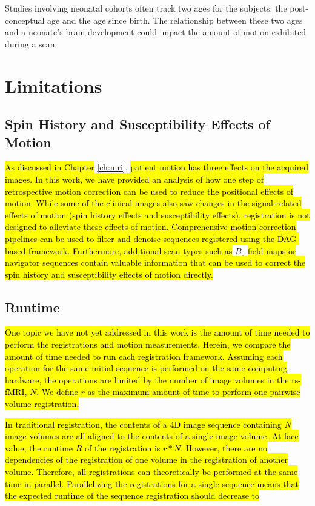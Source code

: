 Studies involving neonatal cohorts often track two ages for the subjects: the post-conceptual age and the age since birth. The relationship between these two ages and a neonate's brain development could impact the amount of motion exhibited during a scan.


\section{Limitations}

\subsection{Spin History and Susceptibility Effects of Motion}

\hl{As discussed in Chapter} \ref{ch:mri}, \hl{patient motion has three effects on the acquired images. In this work, we have provided an analysis of how one step of retrospective motion correction can be used to reduce the positional effects of motion. While some of the clinical images also saw changes in the signal-related effects of motion (spin history effects and susceptibility effects), registration is not designed to alleviate these effects of motion. Comprehensive motion correction pipelines can be used to filter and denoise sequences registered using the DAG-based framework. Furthermore, additional scan types such as} $B_0$ \hl{field maps or navigator sequences contain valuable information that can be used to correct the spin history and susceptibility effects of motion directly.}

\subsection{Runtime}
\hl{
One topic we have not yet addressed in this work is the amount of time needed to perform the registrations and motion measurements. Herein, we compare the amount of time needed to run each registration framework. Assuming each operation for the same initial sequence is performed on the same computing hardware, the operations are limited by the number of image volumes in the rs-fMRI, $N$. We define $r$ as the maximum amount of time to perform one pairwise volume registration.}

\hl{In traditional registration, the contents of a 4D image sequence containing $N$ image volumes are all aligned to the contents of a single image volume. At face value, the runtime $R$ of the registration is $r*N$. However, there are no dependencies of the registration of one volume in the registration of another volume. Therefore, all registrations can theoretically be performed at the same time in parallel. Parallelizing the registrations for a single sequence means that the expected runtime of the sequence registration should decrease to }

